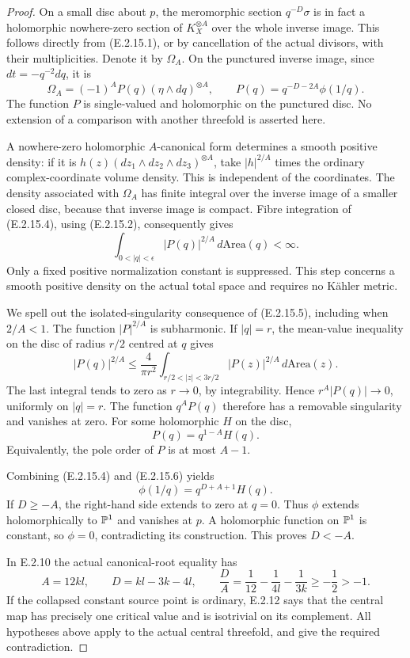 \begin{proof}
On a small disc about $p$, the meromorphic section
$q^{-D}\sigma$ is in fact a holomorphic nowhere-zero section
of $K_X^{\otimes A}$ over the whole inverse image.  This
follows directly from (E.2.15.1), or by cancellation of the
actual divisors, with their multiplicities.  Denote it by
$\Omega_A$.  On the punctured inverse image, since
$dt=-q^{-2}dq$, it is
\[
 \Omega_A=(-1)^A P(q)(\eta\wedge dq)^{\otimes A},
 \qquad P(q)=q^{-D-2A}\phi(1/q).
 \tag{E.2.15.4}
\]
The function $P$ is single-valued and holomorphic on the
punctured disc.  No extension of a comparison with another
threefold is asserted here.

A nowhere-zero holomorphic $A$-canonical form determines
a smooth positive density: if it is
$h(z)(dz_1\wedge dz_2\wedge dz_3)^{\otimes A}$, take
$|h|^{2/A}$ times the ordinary complex-coordinate volume
density.  This is independent of the coordinates.  The
density associated with $\Omega_A$ has finite integral
over the inverse image of a smaller closed disc, because
that inverse image is compact.  Fibre integration of
(E.2.15.4), using (E.2.15.2), consequently gives
\[
 \int_{0<|q|<\epsilon}|P(q)|^{2/A}\,d\mathrm{Area}(q)
 <\infty.
 \tag{E.2.15.5}
\]
Only a fixed positive normalization constant is suppressed.
This step concerns a smooth positive density on the actual
total space and requires no K\"ahler metric.

We spell out the isolated-singularity consequence of
(E.2.15.5), including when $2/A<1$.  The function
$|P|^{2/A}$ is subharmonic.  If $|q|=r$, the mean-value
inequality on the disc of radius $r/2$ centred at $q$ gives
\[
 |P(q)|^{2/A}
 \leq \frac{4}{\pi r^2}
       \int_{r/2<|z|<3r/2}|P(z)|^{2/A}\,d\mathrm{Area}(z).
\]
The last integral tends to zero as $r\to0$, by
integrability.  Hence $r^A|P(q)|\to0$, uniformly on
$|q|=r$.  The function $q^A P(q)$ therefore has a removable
singularity and vanishes at zero.  For some holomorphic
$H$ on the disc,
\[
 P(q)=q^{1-A}H(q).
 \tag{E.2.15.6}
\]
Equivalently, the pole order of $P$ is at most $A-1$.

Combining (E.2.15.4) and (E.2.15.6) yields
\[
 \phi(1/q)=q^{D+A+1}H(q).
 \tag{E.2.15.7}
\]
If $D\geq-A$, the right-hand side extends to zero at
$q=0$.  Thus $\phi$ extends holomorphically to $\mathbb P^1$
and vanishes at $p$.  A holomorphic function on $\mathbb P^1$
is constant, so $\phi=0$, contradicting its construction.
This proves $D<-A$.

In E.2.10 the actual canonical-root equality has
\[
 A=12kl,\qquad D=kl-3k-4l,
 \qquad
 \frac DA=\frac1{12}-\frac1{4l}-\frac1{3k}
       \geq-\frac12>-1.
\]
If the collapsed constant source point is ordinary,
E.2.12 says that the central map has precisely one
critical value and is isotrivial on its complement.
All hypotheses above apply to the actual central
threefold, and give the required contradiction.
\end{proof}

